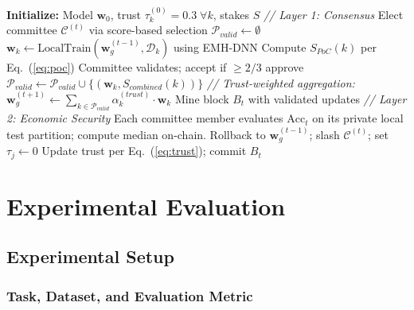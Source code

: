 \documentclass[conference]{IEEEtran}
\begin{document}
\begin{algorithm}[t]
\caption{Secure Two-Layer Federated Learning}
\label{alg:protocol}
\scriptsize
\begin{algorithmic}[1]
\STATE \textbf{Initialize:} Model $\mathbf{w}_0$, trust $\tau_k^{(0)} = 0.3\;\forall k$, stakes $S$
    \STATE \textit{// Layer 1: Consensus}
    \STATE Elect committee $\mathcal{C}^{(t)}$ via score-based selection
    \STATE $\mathcal{P}_{valid} \leftarrow \emptyset$
        \STATE $\mathbf{w}_k \leftarrow \text{LocalTrain}(\mathbf{w}_g^{(t-1)}, \mathcal{D}_k)$ using EMH-DNN
        \STATE Compute $S_{PoC}(k)$ per Eq.~(\ref{eq:poc})
            \STATE Committee validates; accept if $\geq 2/3$ approve
                \STATE $\mathcal{P}_{valid} \leftarrow \mathcal{P}_{valid} \cup \{(\mathbf{w}_k, S_{combined}(k))\}$
            \ENDIF
        \ENDIF
    \ENDFOR
    \STATE \textit{// Trust-weighted aggregation:}
    \STATE $\mathbf{w}_g^{(t+1)} \leftarrow
           \sum_{k \in \mathcal{P}_{valid}} \alpha_k^{(trust)} \cdot \mathbf{w}_k$
    \STATE Mine block $B_t$ with validated updates
    \STATE \textit{// Layer 2: Economic Security}
    \STATE Each committee member evaluates $\text{Acc}_t$ on its private
           local test partition; compute median on-chain.
        \STATE Rollback to $\mathbf{w}_g^{(t-1)}$; slash $\mathcal{C}^{(t)}$;
               set $\tau_j \leftarrow 0$
    \ELSE
        \STATE Update trust per Eq.~(\ref{eq:trust}); commit $B_t$
    \ENDIF
\ENDFOR
\end{algorithmic}
\end{algorithm}

\section{Experimental Evaluation}

\subsection{Experimental Setup}

\subsubsection{Task, Dataset, and Evaluation Metric}
\label{sec:task}
\end{document}
